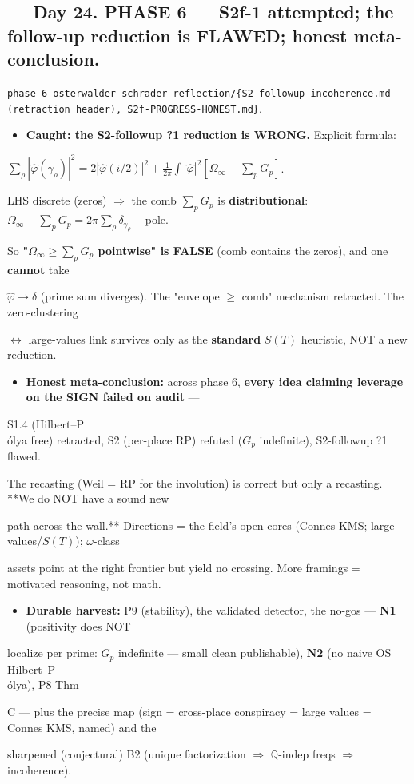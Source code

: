 \documentclass[10pt]{article}
\begin{document}
\subsection*{ --- Day 24. PHASE 6 --- S2f-1 attempted; the follow-up reduction is FLAWED; honest meta-conclusion.}
\texttt{phase-6-osterwalder-schrader-reflection/\{S2-followup-incoherence.md (retraction header), S2f-PROGRESS-HONEST.md\}}.\par
\begin{itemize}
\item \textbf{Caught: the S2-followup ?1 reduction is WRONG.} Explicit formula:
\end{itemize}
  $\sum_\rho|\hat\varphi(\gamma_\rho)|^2=2|\hat\varphi(i/2)|^2+\frac1{2\pi}\int|\hat\varphi|^2[\Omega_\infty-\sum_pG_p]$.\par
  LHS discrete (zeros) \ensuremath{\Rightarrow} the comb $\sum_pG_p$ is \textbf{distributional}: $\Omega_\infty-\sum_pG_p=2\pi\sum_\rho\delta_{\gamma_\rho}-$pole.\par
  So \textbf{"$\Omega_\infty\ge\sum_pG_p$ pointwise" is FALSE} (comb contains the zeros), and one \textbf{cannot} take\par
  $\hat\varphi\to\delta$ (prime sum diverges). The "envelope \ensuremath{\ge} comb" mechanism retracted. The zero-clustering\par
  \ensuremath{\leftrightarrow} large-values link survives only as the \textbf{standard} $S(T)$ heuristic, NOT a new reduction.\par
\begin{itemize}
\item \textbf{Honest meta-conclusion:} across phase 6, \textbf{every idea claiming leverage on the SIGN failed on audit} ---
\end{itemize}
  S1.4 (Hilbert--P\\\'olya free) retracted, S2 (per-place RP) refuted ($G_p$ indefinite), S2-followup ?1 flawed.\par
  The recasting (Weil = RP for the involution) is correct but only a recasting. **We do NOT have a sound new\par
  path across the wall.** Directions = the field's open cores (Connes KMS; large values/$S(T)$); \ensuremath{\omega}-class\par
  assets point at the right frontier but yield no crossing. More framings = motivated reasoning, not math.\par
\begin{itemize}
\item \textbf{Durable harvest:} P9 (stability), the validated detector, the no-gos --- \textbf{N1} (positivity does NOT
\end{itemize}
  localize per prime: $G_p$ indefinite --- small clean publishable), \textbf{N2} (no naive OS Hilbert--P\\\'olya), P8 Thm\par
  C --- plus the precise map (sign = cross-place conspiracy = large values = Connes KMS, named) and the\par
  sharpened (conjectural) B2 (unique factorization \ensuremath{\Rightarrow} \ensuremath{\mathbb{Q}}-indep freqs \ensuremath{\Rightarrow} incoherence).\par
\end{document}
